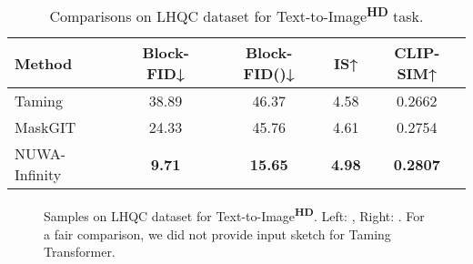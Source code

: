 \documentclass{article}
\begin{document}
\begin{table}[htbp]
\small
\centering
\setlength{\tabcolsep}{14pt}
\begin{tabular}{lcccc}
 \toprule
Method    & Block-FID↓    & Block-FID()↓ & IS↑           & CLIP-SIM↑       \\    
\midrule
Taming \cite{esserTamingTransformersHighResolution2021}    & 38.89         & 46.37          & 4.58          & 0.2662          \\
MaskGIT \cite{changMaskGITMaskedGenerative2022}   & 24.33         & 45.76          & 4.61          & 0.2754          \\
NUWA-Infinity & \textbf{9.71} & \textbf{15.65} & \textbf{4.98} & \textbf{0.2807} \\
 \bottomrule
\end{tabular}
\vspace{-2mm}
\caption{Comparisons on LHQC dataset for Text-to-Image\textsuperscript{\textbf{HD}} task.}
\label{tab:t2i_task}
\end{table}



\begin{figure}[h]
    \caption{Samples on LHQC dataset for Text-to-Image\textsuperscript{\textbf{HD}}. Left: , Right: . For a fair comparison, we did not provide input sketch for Taming Transformer.}
    \label{fig:vis_t2i}
    	\vspace{-3mm}
\end{figure}
\end{document}
